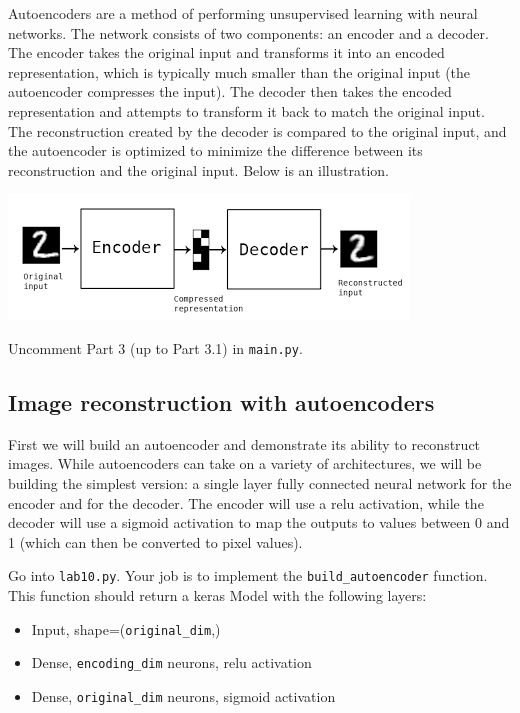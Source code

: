 \documentclass{article}
\begin{document}
Autoencoders are a method of performing unsupervised learning with neural networks. The network consists of two components: an encoder and a decoder. The encoder takes the original input and transforms it into an encoded representation, which is typically much smaller than the original input (the autoencoder compresses the input). The decoder then takes the encoded representation and attempts to transform it back to match the original input. The reconstruction created by the decoder is compared to the original input, and the autoencoder is optimized to minimize the difference between its reconstruction and the original input. Below is an illustration.

\noindent
\includegraphics[width=\textwidth]{autoencoder.png}

Uncomment Part 3 (up to Part 3.1) in \texttt{main.py}.

\subsection{Image reconstruction with autoencoders}

First we will build an autoencoder and demonstrate its ability to reconstruct images. While autoencoders can take on a variety of architectures, we will be building the simplest version: a single layer fully connected neural network for the encoder and for the decoder. The encoder will use a relu activation, while the decoder will use a sigmoid activation to map the outputs to values between 0 and 1 (which can then be converted to pixel values).

Go into \texttt{lab10.py}. Your job is to implement the \texttt{build\_autoencoder} function. This function should return a keras Model with the following layers:

\begin{itemize}
    \item Input, shape=(\texttt{original\_dim},)
    
    \item Dense, \texttt{encoding\_dim} neurons, relu activation
    
    \item Dense, \texttt{original\_dim} neurons, sigmoid activation
\end{itemize}
\end{document}
